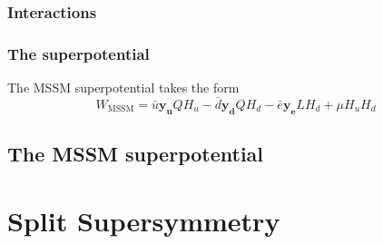 \subsubsection{Interactions}
\subsubsection{The superpotential}
The MSSM superpotential takes the form
\[W_\text{MSSM} = \bar{u}\mathbf{y_u}QH_u-\bar{d}\mathbf{y_d}Q H_d-\bar{e}\mathbf{y_e}L H_d+\mu H_u H_d \]
\subsection{The MSSM superpotential}
\section{Split Supersymmetry}

